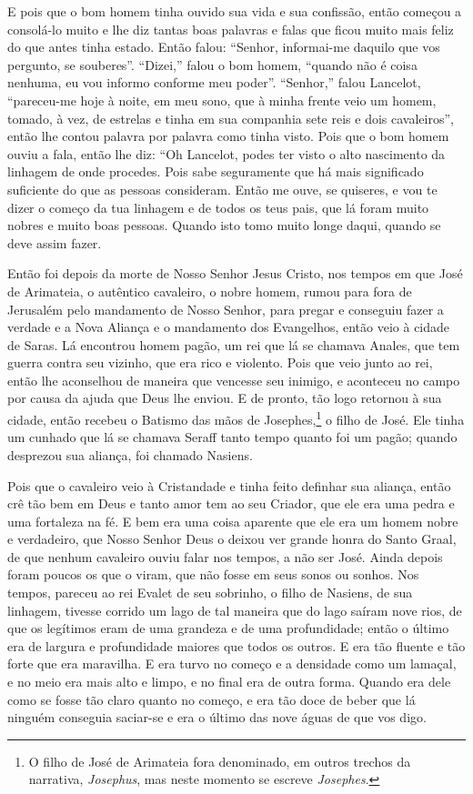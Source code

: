 E pois que o bom homem tinha ouvido sua vida e sua confissão, então começou
a consolá-lo muito e lhe diz tantas boas palavras e falas que ficou muito mais
feliz do que antes tinha estado. Então falou: “Senhor, informai-me daquilo que
vos pergunto, se souberes”. “Dizei,” falou o bom homem, “quando não é coisa
nenhuma, eu vou informo conforme meu poder”. “Senhor,” falou Lancelot,
“pareceu-me hoje à noite, em meu sono, que à minha frente veio um homem,
tomado, à vez, de estrelas e tinha em sua companhia sete reis e dois
cavaleiros”, então lhe contou palavra por palavra como tinha visto. Pois que o
bom homem ouviu a fala, então lhe diz: “Oh Lancelot, podes ter visto o alto
nascimento da linhagem de onde procedes. Pois sabe seguramente que há mais
significado suficiente do que as pessoas consideram. Então me ouve, se
quiseres, e vou te dizer o começo da tua linhagem e de todos os teus pais, que
lá foram muito nobres e muito boas pessoas. Quando isto tomo muito longe daqui,
quando se deve assim fazer.

Então foi depois da morte de Nosso Senhor Jesus Cristo, nos tempos em que
José de Arimateia, o autêntico cavaleiro, o nobre homem, rumou para fora de
Jerusalém pelo mandamento de Nosso Senhor, para pregar e conseguiu fazer a
verdade e a Nova Aliança e o mandamento dos Evangelhos, então veio à cidade de
Saras. Lá encontrou homem pagão, um rei que lá se chamava Anales, que tem
guerra contra seu vizinho, que era rico e violento. Pois que veio junto ao rei,
então lhe aconselhou de maneira que vencesse seu inimigo, e aconteceu no campo
por causa da ajuda que Deus lhe enviou. E de pronto, tão logo retornou à sua
cidade, então recebeu o Batismo das mãos de Josephes,\footnote{ O filho de José
de Arimateia fora denominado, em outros trechos da narrativa,
\textit{Josephus}, mas neste momento se escreve \textit{Josephes}. 
} o filho de José. Ele tinha um cunhado que lá se chamava Seraff tanto tempo
quanto foi um pagão; quando desprezou sua aliança, foi chamado Nasiens.

  Pois que o cavaleiro veio à Cristandade e tinha feito definhar sua
aliança, então crê tão bem em Deus e tanto amor tem ao seu Criador, que ele era
uma pedra e uma fortaleza na fé. E bem era uma coisa aparente que ele era um
homem nobre e verdadeiro, que Nosso Senhor Deus o deixou ver grande honra do
Santo Graal, de que nenhum cavaleiro ouviu falar nos tempos, a não ser José.
Ainda depois foram poucos os que o viram, que não fosse em seus sonos ou
sonhos. Nos tempos, pareceu ao rei Evalet de seu sobrinho, o filho de Nasiens,
de sua linhagem, tivesse corrido um lago de tal maneira que do lago saíram nove
rios, de que os legítimos eram de uma grandeza e de uma profundidade; então o
último era de largura e profundidade maiores que todos os outros. E era tão
fluente e tão forte que era maravilha. E era turvo no começo e a densidade como
um lamaçal, e no meio era mais alto e limpo, e no final era de outra forma.
Quando era dele como se fosse tão claro quanto no começo, e era tão doce de
beber que lá ninguém conseguia saciar-se e era o último das nove águas de que
vos digo.


